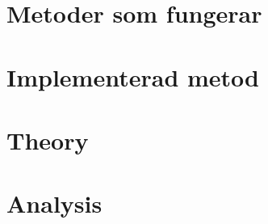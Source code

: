\section{Metoder som fungerar}





\section{Implementerad metod}







\section{Theory}



\section{Analysis}




